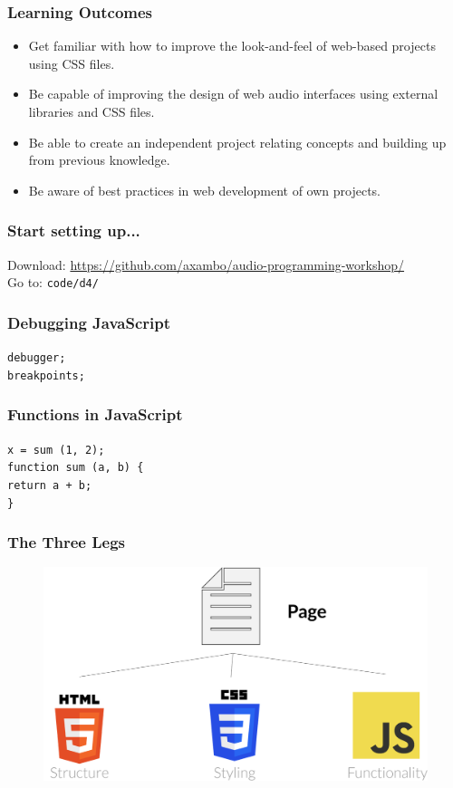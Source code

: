 \documentclass[screen, aspectratio=43]{beamer}
\begin{document}
%
\begin{frame}
\frametitle{Learning Outcomes}
\begin{itemize}
\item Get familiar with how to improve the look-and-feel of web-based projects using CSS files.
\item Be capable of improving the design of web audio interfaces using external libraries and CSS files.
\item Be able to create an independent project relating concepts and building up from previous knowledge.
\item Be aware of best practices in web development of own projects.
\end{itemize}
\end{frame}
%
\begin{frame}
\frametitle{Start setting up...}
Download: \url{https://github.com/axambo/audio-programming-workshop/} 
\\
\vspace{10 mm}
Go to: \texttt{code/d4/}
\end{frame}
%	
\begin{frame}
\frametitle{Debugging JavaScript}
 \texttt{debugger;}\\
 \texttt{breakpoints;} 
\end{frame}
%
\begin{frame}
\frametitle{Functions in JavaScript}
\texttt{x = sum (1, 2);}\\
\vspace{10 mm}
\texttt{function sum (a, b) \{}\\
\setlength\parindent{24pt} \texttt{return a + b;}\\
\setlength\parindent{0pt}\texttt{\}}
\end{frame}
%
\begin{frame}
\frametitle{The Three Legs}
   \begin{figure}
	\includegraphics[scale=0.2]{img/three-legs-codeanalogies-blog.png}
    \end{figure}
\vspace{10 mm}
\end{frame}
\end{document}
